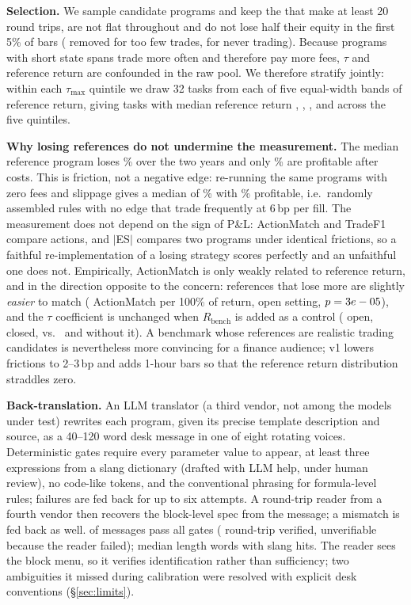\documentclass[sigconf,anonymous,review]{acmart}
\begin{document}
\textbf{Selection.} We sample \NPool{} candidate programs and keep the \NPoolKept{} that make at least
20 round trips, are not flat throughout and do not lose half their equity in the first 5\% of bars
(\NFewTrades{} removed for too few trades, \NAlwaysFlat{} for never trading). Because programs with
short state spans trade more often and therefore pay more fees, $\tau$ and reference return are
confounded in the raw pool. We therefore stratify jointly: within each $\tau_{\max}$ quintile we draw
32 tasks from each of five equal-width bands of reference return, giving \NTasks{} tasks with median
reference return \RMedBinA, \RMedBinB, \RMedBinC, \RMedBinD{} and \RMedBinE{} across the five quintiles.

\textbf{Why losing references do not undermine the measurement.} The median reference program
loses \RNetMed\% over the two years and only \ShareNetPos\% are profitable after costs. This is
friction, not a negative edge: re-running the same programs with zero fees and slippage gives a
median of \RGrossMed\% with \ShareGrossPos\% profitable, i.e.\ randomly assembled rules with no edge
that trade frequently at 6\,bp per fill. The measurement does not depend on the sign of P\&L:
ActionMatch and TradeF1 compare actions, and $|$ES$|$ compares two programs under identical
frictions, so a faithful re-implementation of a losing strategy scores perfectly and an unfaithful
one does not. Empirically, ActionMatch is only weakly related to reference return, and in the
direction opposite to the concern: references that lose more are slightly \emph{easier} to match
(\RegOpenRonly{} ActionMatch per 100\% of return, open setting, $p=3e-05$), and the $\tau$
coefficient is unchanged when $R_{\text{bench}}$ is added as a control (\RegOpenTauGivenR{} open,
\RegClosedTauGivenR{} closed, vs.\ \RegOpenTauOnlyTau{} and \RegClosedTauOnlyTau{} without it). A
benchmark whose references are realistic trading candidates is nevertheless more convincing for a
finance audience; v1 lowers frictions to 2--3\,bp and adds 1-hour bars so that the reference return
distribution straddles zero.

\textbf{Back-translation.} An LLM translator (a third vendor, not among the models under test)
rewrites each program, given its precise template description and source, as a 40--120 word desk
message in one of eight rotating voices. Deterministic gates require every parameter value to appear,
at least three expressions from a slang dictionary (drafted with LLM help, under human review), no
code-like tokens, and the conventional phrasing for formula-level rules; failures are fed back for up
to six attempts. A round-trip reader from a fourth vendor then recovers the block-level spec from the
message; a mismatch is fed back as well. \NValidPrompts{} of \NTasks{} messages pass all gates
(\NRoundTripOK{} round-trip verified, \NRoundTripNA{} unverifiable because the reader failed); median
length \MedWords{} words with \MedJargon{} slang hits. The reader sees the block menu, so it verifies
identification rather than sufficiency; two ambiguities it missed during calibration were resolved
with explicit desk conventions (\S\ref{sec:limits}).
\end{document}
